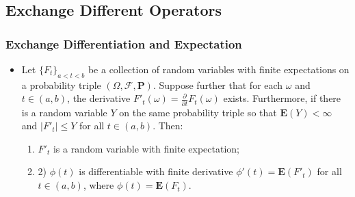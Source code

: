 \documentclass[handout]{beamer}
\newcommand{\BP}{\mathbf{P}}
\newcommand{\BE}{\mathbf{E}}
\begin{document}
\subsection{Exchange Different Operators}
\frame
{
  \frametitle{Exchange Differentiation and Expectation} 

   \begin{itemize}
   
  
                
                
                    \item<3->[] \begin{Theorem} Let $\{F_t\}_{a<t<b}$ be a collection of random variables with finite expectations on a probability triple $(\Omega, \mathcal{F}, \BP)$. Suppose further that for each $\omega$ and $t\in (a,b)$, the derivative $F'_t(\omega)=\frac{\partial}{\partial t} F_t(\omega)$ exists. Furthermore, if there is a random variable $Y$ on the same probability triple so that $\BE(Y)<\infty$ and $|F'_t| \leq Y$ for all $t\in (a,b)$. Then: 
                    \begin{enumerate}
                    \item $F'_t$ is a random variable with finite expectation;
                    \item 2) $\phi(t)$ is differentiable with finite derivative $\phi'(t)=\BE(F'_t)$ for all $t\in (a,b)$, where $\phi(t)=\BE(F_t)$. 
                    \end{enumerate}
                    \end{Theorem}


\end{itemize}
}
\end{document}
